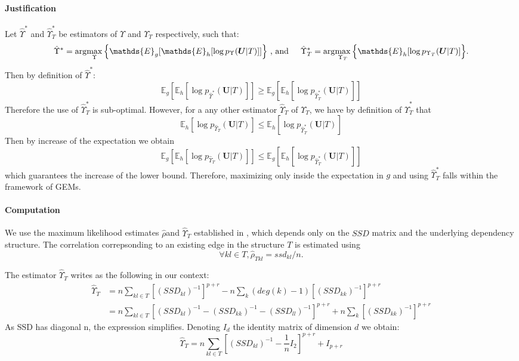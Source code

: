 \documentclass[11pt,a4paper]{article}
\newcommand{\argmax}{\arg\!\max}
\newcommand{\Ubf}{\boldsymbol{U}}
\newcommand{\Esp}{\mathds{E}}
\begin{document}
\paragraph{Justification\\}
Let $\hat{\Upsilon}^*$ and $\hat{\Upsilon}_T^*$ be estimators of $\Upsilon$ and $\Upsilon_T$ respectively, such that:
$$\hat{\Upsilon}^*=\argmax_\Upsilon \Big\{\Esp_g[\Esp_h[\log p_\Upsilon(\Ubf|T)]]\Big\} \text{ , and\hspace{0.5cm}}\hat{\Upsilon}_T^*=\argmax_{\Upsilon_T} \Big\{\Esp_h[\log p_{\Upsilon_T}(\Ubf|T)]\Big\}.$$
Then by definition of $\hat{\Upsilon}^*$:
$$\Esp_g[\Esp_h[\log p_{\hat{\Upsilon}^*}(\Ubf|T)]] \geq \Esp_g[\Esp_h[\log p_{\hat{\Upsilon}_T^*}(\Ubf|T)]] $$
Therefore the use of $\hat{\Upsilon}_T^*$ is sub-optimal. However, for a any other estimator  $\hat{\Upsilon}_T$ of $\Upsilon_T$, we have by definition of $\hat{\Upsilon}_T^*$ that
$$\Esp_h[\log p_{\hat{\Upsilon}_T}(\Ubf|T)] \leq \Esp_h[\log p_{\hat{\Upsilon}_T^*}(\Ubf|T)] $$
Then by increase of the expectation we obtain
$$\Esp_g[\Esp_h[\log p_{\hat{\Upsilon}_T}(\Ubf|T)]] \leq \Esp_g[\Esp_h[\log p_{\hat{\Upsilon}_T^*}(\Ubf|T)]] $$
which guarantees the increase of the lower bound. Therefore, maximizing only inside the expectation in $g$ and using $\hat{\Upsilon}_T^*$ falls within the framework of GEMs.

\paragraph{Computation\\}
 We use the maximum likelihood estimates $\hat{\rho} $and $\hat{\Upsilon}_T$ established in \citet{Lau96}, which depends only on the $SSD$ matrix and the underlying dependency structure.
  The correlation correpsonding to an existing edge in the structure $T$ is estimated using
  $$ \forall kl\in T,\boxed{\hat{\rho}_{Tkl} = ssd_{kl}/n}.$$
  
   The estimator  $\hat{\Upsilon}_T$  writes as the following in our context:
\begin{align*}
\widehat{\Upsilon}_T &= n  \sum_{kl\in T}   [(SSD_{kl})^{-1}]^{p+r} - n\sum_k (deg(k)-1)[(SSD_{kk})^{-1}]^{p+r}\\
&=n \sum_{kl\in T}  [(SSD_{kl})^{-1} - (SSD_{kk})^{-1} -  (SSD_{ll})^{-1} ]^{p+r} + n\sum_k[(SSD_{kk})^{-1}]^{p+r}
\end{align*}
As SSD has diagonal n, the expression simplifies. Denoting $I_d$ the identity matrix of dimension $d$ we obtain:
$$\widehat{\Upsilon}_T =n\sum_{kl\in T} [(SSD_{kl})^{-1} -\frac{1}{n} I_2]^{p+r}+ I_{p+r}$$
\end{document}
